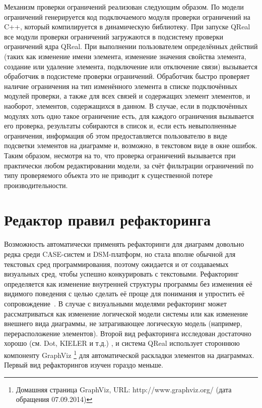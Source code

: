 Механизм проверки ограничений реализован следующим образом. По модели ограничений 
генерируется код подключаемого модуля проверки ограничений на C++, который компилируется 
в динамическую библиотеку. При запуске QReal все модули проверки ограничений загружаются 
в подсистему проверки ограничений ядра QReal. При выполнении пользователем определённых 
действий (таких как изменение имени элемента, изменение значения свойства элемента, 
создание или удаление элемента, подключение или отключение связи) вызывается обработчик 
в подсистеме проверки ограничений. Обработчик быстро проверяет наличие ограничения 
на тип изменённого элемента в списке подключённых модулей проверки, а также для всех 
связей и содержащих элемент элементов, и наоборот, элементов, содержащихся в данном. 
В случае, если в подключённых модулях хоть одно такое ограничение есть, для каждого 
ограничения вызывается его проверка, результаты собираются в список и, если есть невыполненные 
ограничения, информация об этом предоставляется пользователю в виде подсветки элементов 
на диаграмме и, возможно, в текстовом виде в окне ошибок. Таким образом, несмотря на то, 
что проверка ограничений вызывается при практически любом редактировании модели, за 
счёт фильтрации ограничений по типу проверяемого объекта это не приводит к существенной 
потере производительности.

\section{Редактор правил рефакторинга}
Возможность автоматически применять рефакторинги для диаграмм довольно редка среди CASE-систем и \ac{DSM}-платформ, 
но стала вполне обычной для текстовых сред программирования, поэтому ожидается и от создаваемых визуальных сред, чтобы успешно конкурировать с текстовыми. 
Рефакторинг определяется как изменение внутренней структуры программы без изменения 
её видимого поведения с целью сделать её проще для понимания и упростить её сопровождение~\cite{fowler2003refactoring}. 
В случае с визуальными моделями рефакторинг может рассматриваться как изменение логической 
модели системы или как изменение внешнего вида диаграммы, не затрагивающее логическую 
модель (например, перерасположение элементов). Второй вид рефакторинга исследован 
достаточно хорошо (см. Dot, KIELER и т.д.)%
, и система QReal использует стороннюю компоненту GraphViz%
\footnote{Домашняя страница GraphViz, URL: http://www.graphviz.org/ (дата обращения 07.09.2014)}
для автоматической раскладки элементов на диаграммах. Первый вид рефакторингов изучен 
гораздо меньше.

